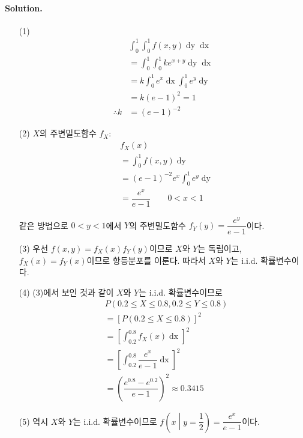 \paragraph{Solution.} \begin{itemize}
  \item [(1)] \begin{align*}
	& \int_0^1 \int_0^1 f\left(x, y\right) \mathop{dy} \mathop{dx} \\
	&= \int_0^1 \int_0^1 ke^{x+y} \mathop{dy} \mathop{dx} \\
	&= k \int_0^1 e^x \mathop{dx} \int_0^1 e^y \mathop{dy}\\
	&= k \left(e - 1\right)^2 = 1\\
	\therefore k &= \left(e - 1\right)^{-2}
\end{align*}

  \item [(2)] $X$의 주변밀도함수 $f_X$:
\begin{align*}
	& f_X\left(x\right) \\
	&= \int_0^1 f\left(x, y\right) \mathop{dy} \\
	&= \left(e - 1\right)^{-2}e^x \int_0^1 e^y \mathop{dy}\\
	&= \dfrac{e^x}{e - 1} \qquad 0<x<1
\end{align*}

같은 방법으로 $0<y<1$에서 $Y$의 주변밀도함수 $f_Y\left(y\right) = \dfrac{e^y}{e - 1}$이다.

  \item [(3)] 우선 $f\left(x, y\right)=f_X\left(x\right)f_Y\left(y\right)$이므로 $X$와 $Y$는 독립이고, $f_X\left(x\right)=f_Y\left(x\right)$이므로 항등분포를 이룬다. 따라서 $X$와 $Y$는 i.i.d. 확률변수이다.
  \item [(4)] (3)에서 보인 것과 같이 $X$와 $Y$는 i.i.d. 확률변수이므로
\begin{align*}
	& P\left(0.2\leq X\leq 0.8, 0.2\leq Y\leq 0.8\right) \\
	&= \left[P\left(0.2\leq X\leq 0.8\right)\right]^2 \\
	&= \left[ \int_{0.2}^{0.8} f_X\left(x\right) \mathop{dx}\right]^2 \\
	&= \left[ \int_{0.2}^{0.8} \dfrac{e^x}{e - 1} \mathop{dx}\right]^2 \\
	&= \left(\dfrac{e^{0.8} - e^{0.2}}{e - 1} \right)^2 \approx0.3415
\end{align*}
  \item [(5)] 역시 $X$와 $Y$는 i.i.d. 확률변수이므로 $f\left(x\middle|y=\dfrac{1}{2}\right) = \dfrac{e^x}{e - 1}$이다.
\end{itemize}